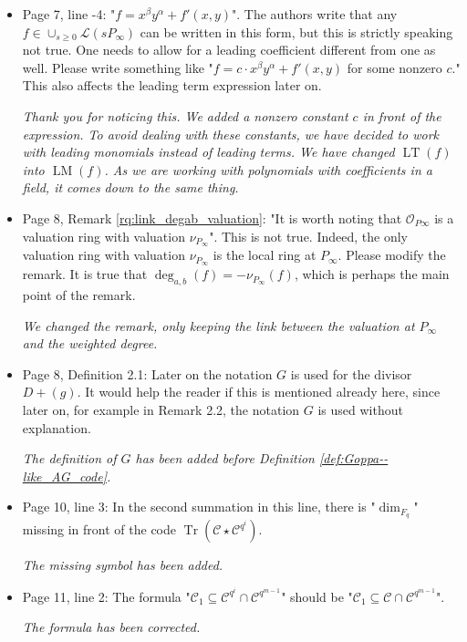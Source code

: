 \documentclass[12pt,a4paper]{amsart}
\DeclareMathOperator{\trace}{Tr}
\newcommand{\calC}{\mathcal{C}}
\newcommand{\Tr}[1]{\trace\!\left(#1\right)}
\begin{document}
\begin{itemize}
\item Page 7, line -4: "$f=x^\beta y^\alpha+f'(x,y)$". The authors write that any $f \in \cup_{s \ge 0} \mathcal{L}(sP_\infty)$ can be written in this form, but this is strictly speaking not true. One needs to allow for a leading coefficient different from one as well. Please write something like "$f=c\cdot x^\beta y^\alpha+f'(x,y)$ for some nonzero $c$." This also affects the leading term expression later on.

\textit{Thank you for noticing this. We added a nonzero constant $c$ in front of the expression. To avoid dealing with these constants, we have decided to work with leading \emph{monomials} instead of leading terms. We have changed $\operatorname{LT}(f)$ into $\operatorname{LM}(f)$. As we are working with polynomials with coefficients in a field, it comes down to the same thing.}

\item Page 8, Remark \ref{rq:link_degab_valuation}: "It is worth noting that $\mathcal{O}_{P\infty}$ is a valuation ring with valuation $\nu_{P_\infty}$". This is not true. Indeed, the only valuation ring with valuation $\nu_{P_\infty}$ is the local ring at $P_\infty$. Please modify the remark. It is true that $\deg_{a,b}(f)=-\nu_{P_\infty}(f)$, which is perhaps the main point of the remark.

\textit{We changed the remark, only keeping the link between the valuation at $P_\infty$ and the weighted degree.}


\item Page 8, Definition 2.1: Later on the notation $G$ is used for the divisor $D+(g)$. It would help the reader if this is mentioned already here, since later on, for example in Remark 2.2, the notation $G$ is used without explanation.

\textit{The definition of $G$ has been added before Definition \ref{def:Goppa--like_AG_code}.}


\item Page 10, line 3: In the second summation in this line, there is "$\dim_{F_{q}}$" missing in front of the code $\Tr{\calC \star \calC^{q^i}}$.

\textit{The missing symbol has been added.}

\item Page 11, line 2: The formula "$\calC_1 \subseteq \calC^{q^i} \cap \calC^{q^{m-1}}$" should be "$\calC_1 \subseteq \calC \cap \calC^{q^{m-1}}$". 

\textit{The formula has been corrected.}


\end{itemize}
\end{document}
